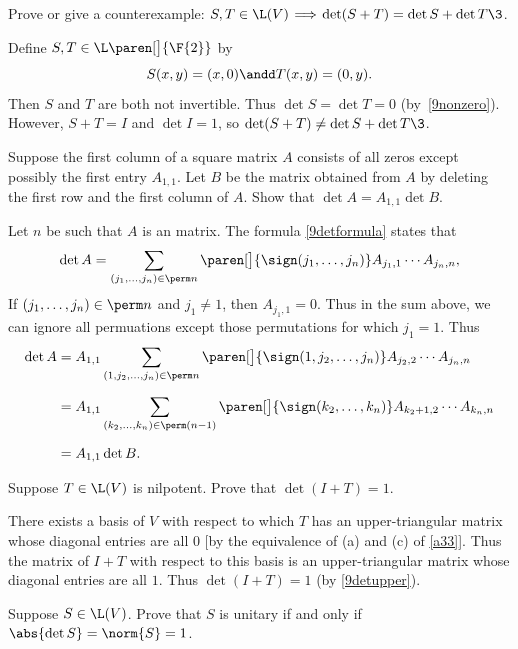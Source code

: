 
\exercise
Prove or give a counterexample: $S, T \in \L(V) \!\implies\! \det (S+T) = \det S + \det T\3$.

\begin{Solution}
Define $S, T \in \L\paren[\big]{\F{2}}$ by
\[
S(x,y) = (x, 0) \andd T(x,y) = (0,y).
\]
Then $S$ and $T$ are both not invertible.  Thus $\det S = \det T = 0$
(by~\ref{9nonzero}).  However, $S + T = I$ and $\det I = 1$, so
$\det (S+T) \ne \det S + \det T\3$.
\end{Solution}

\exercise
Suppose the first column of a square matrix $A$ consists of all zeros except possibly the first entry $A_{1,1}$. Let $B$ be the matrix obtained from $A$ by deleting the first row and the first column of $A$. Show that $\det A = A_{1,1} \det B$.

\begin{Solution}
Let $n$ be such that $A$ is an  matrix. The formula \ref{9detformula} states that
\[
\det A = \sum_{(j_1, \ldots, j_n) \in \perm n} \paren[\bigl]{ \sign(j_1, \ldots, j_n) } A_{j_1,1} \cdots A_{j_n,n},
\]
If $(j_1, \ldots, j_n) \in \perm n$ and $j_1 \ne 1$, then $A_{j_1, 1} = 0$. Thus in the sum above, we can ignore all permuations except those permutations for which $j_1 = 1$. Thus
\begin{align*}
\det A &= A_{1,1} \sum_{(1, j_2, \ldots, j_n) \in \perm n} \paren[\bigl]{ \sign(1, j_2, \ldots, j_n) } A_{j_2,2} \cdots A_{j_n,n} \\[6bp]
&= A_{1,1} \sum_{(k_2, \ldots, k_n) \in \perm (n-1)} \paren[\bigl]{ \sign(k_2, \ldots, k_n) } A_{k_2+1,2} \cdots A_{k_n,n} \\[6bp]
&= A_{1,1} \det B.
\end{align*}
\end{Solution}

\exercise
Suppose $T \in \L(V)$ is nilpotent. Prove that $\det(I + T) = 1$.

\begin{Solution}
There exists a basis of $V$ with respect to which $T$ has an upper-triangular matrix whose diagonal entries are all $0$ [by the equivalence of (a) and (c) of \ref{a33}]. Thus the matrix of $I + T$ with respect to this basis is an upper-triangular matrix whose diagonal entries are all $1$. Thus $\det(I + T) = 1$ (by \ref{9detupper}).
\end{Solution}

\exercise
Suppose $S \in \L(V)$. Prove that $S$ is unitary if and only if $\abs{\det S} = \norm{S} = 1$.

